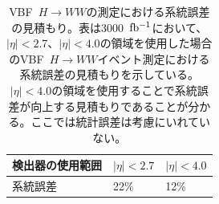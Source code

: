 \begin{table}[bpt]
\begin{center}
\caption[VBF~$H\rightarrow WW$の測定における系統誤差の見積もり]{VBF~$H\rightarrow WW$の測定における系統誤差の見積もり\cite{1-3}。表は3000~$\rm{fb^{-1}}$において、$|\eta| <2.7$、$|\eta| <4.0$の領域を使用した場合のVBF~$H\rightarrow WW$イベント測定における系統誤差の見積もりを示している。$|\eta| <4.0$の領域を使用することで系統誤差が向上する見積もりであることが分かる。ここでは統計誤差は考慮にいれていない。}
\label{VBF_uncertainty}
  \begin{tabular}{|lll|} \hline
    検出器の使用範囲 & $|\eta| <2.7 $ & $|\eta| < 4.0 $ \\ \hline
    系統誤差 & 22$\%$ & 12$\%$ \\ \hline
  \end{tabular}
\end{center}
\end{table}

